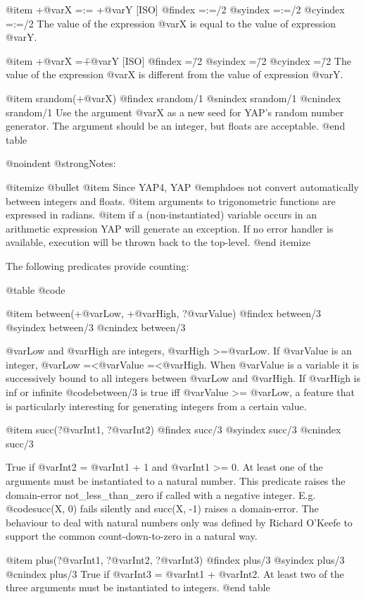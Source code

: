 {{{{@item +@var{X} =:= +@var{Y} [ISO]
@findex =:=/2
@syindex =:=/2
@cyindex =:=/2
The value of the expression @var{X} is equal to the value of expression
@var{Y}.

@item +@var{X} =\= +@var{Y} [ISO]
@findex =\=/2
@syindex =\=/2
@cyindex =\=/2
The value of the expression @var{X} is different from the value of
expression @var{Y}.

@item srandom(+@var{X})
@findex srandom/1
@snindex srandom/1
@cnindex srandom/1
Use the argument @var{X} as a new seed for YAP's random number
generator. The argument should be an integer, but floats are acceptable.
@end table

@noindent
@strong{Notes:}

@itemize @bullet
@item 
Since YAP4, YAP @emph{does not} convert automatically between integers
and floats.
@item
arguments to trigonometric functions are expressed in radians.
@item
if a (non-instantiated) variable occurs in an arithmetic expression YAP
will generate an exception. If no error handler is available, execution
will be thrown back to the top-level.
@end itemize


The following predicates provide counting:

@table @code

@item between(+@var{Low}, +@var{High}, ?@var{Value})
@findex between/3
@syindex between/3
@cnindex between/3

    @var{Low} and @var{High} are integers, @var{High} >=@var{Low}. If
    @var{Value} is an integer, @var{Low} =<@var{Value}
    =<@var{High}. When @var{Value} is a variable it is successively
    bound to all integers between @var{Low} and @var{High}. If
    @var{High} is inf or infinite @code{between/3} is true iff
    @var{Value} >= @var{Low}, a feature that is particularly interesting
    for generating integers from a certain value.

@item succ(?@var{Int1}, ?@var{Int2})
@findex succ/3
@syindex succ/3
@cnindex succ/3

    True if @var{Int2} = @var{Int1} + 1 and @var{Int1} >= 0. At least
    one of the arguments must be instantiated to a natural number. This
    predicate raises the domain-error not_less_than_zero if called with
    a negative integer. E.g. @code{succ(X, 0)} fails silently and succ(X, -1)
    raises a domain-error. The behaviour to deal with natural numbers
    only was defined by Richard O'Keefe to support the common
    count-down-to-zero in a natural way. 

@item plus(?@var{Int1}, ?@var{Int2}, ?@var{Int3})
@findex plus/3
@syindex plus/3
@cnindex plus/3
    True if @var{Int3} = @var{Int1} + @var{Int2}. At least two of the
    three arguments must be instantiated to integers.
@end table

}}}}
